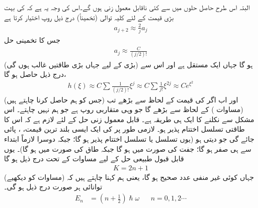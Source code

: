  البتہ اس طرح حاصل حلوں میں سے کئی ناقابل معمول زنی ہوں گے۔اس کی وجہ یہ ہے کہ  کی بہت بڑی قیمت کے لئے کلیہ توالی (تخمیناً) درج ذیل روپ اختیار کرتا ہے
\begin{align*}
a_{j+2}\approx\frac{2}{j}a_{j}
\end{align*}
جس کا تخمینی حل
\begin{align*}
a_{j}\approx\frac{C}{(j/2)!}
\end{align*}
ہو گا جہاں  ایک مستقل ہے اور اس سے (بڑی  کے لیے جہاں بڑی طاقتیں غالب ہوں گی) درج ذیل حاصل ہو گا،
\begin{align*}
h(\xi)\approx C\sum\frac{1}{(j/2)!}\xi^{j}\approx C\sum\frac{1}{j!}\xi^{2j}\approx Ce^{\xi^{2}}
\end{align*}
اور اب اگر  کی قیمت  کے لحاظ سے بڑھے تب  (جس کو ہم حاصل کرنا چاہتے ہیں) 
  (مساوات ) کے لحاظ سے بڑھے گا جو وہی متقاربی 
 روپ ہے جو ہم نہیں چاہتے۔ اس مشکل سے نکلنے کا ایک ہی طریقہ ہے۔ قابل معمول زنی حل کے لئے لازم ہے کہ اس کا طاقتی تسلسل اختتام پذیر ہو۔ لازمی طور پر  کی ایک ایسی بلند ترین قیمت، ، پائی جائے گی جو  دیتی ہو (یوں  تسلسل یا  تسلسل اختتام پذیر ہو گا؛ جبکہ دوسرا لازماً ابتداء سے ہی صفر ہو گا؛ جفت  کی صورت میں  ہو گا جبکہ طاق  کی صورت میں  ہو گا)۔ یوں قابل قبول طبیعی حل کے لیے مساوات  کے تحت درج ذیل ہو گا
\begin{align*}
K=2n+1
\end{align*}
 جہاں  کوئی غیر منفی عدد صحیح ہو گا، یعنی ہم کہنا چاہتے ہیں کہ (مساوات  کو دیکھیے) توانائی ہر صورت درج ذیل ہو گی۔
\begin{align}
E_{n}&=(n+\tfrac{1}{2} )\hslash\omega && n=0,1,2\cdots
\end{align}
